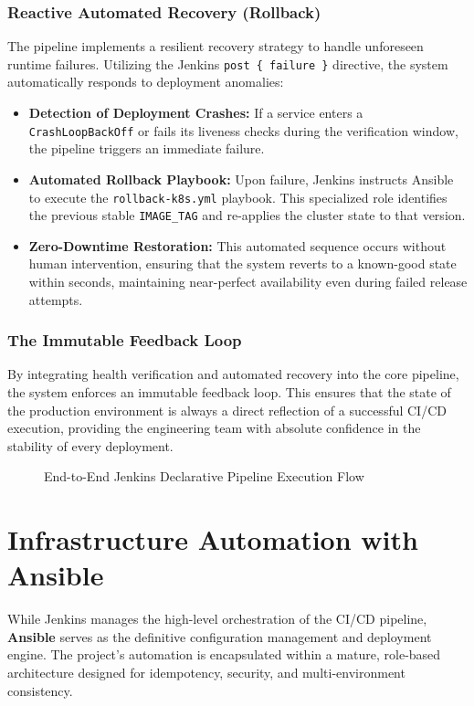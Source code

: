 \documentclass[12pt,a4paper]{report}
\begin{document}
\subsection{Reactive Automated Recovery (Rollback)}
The pipeline implements a resilient recovery strategy to handle unforeseen runtime failures. Utilizing the Jenkins \texttt{post \{ failure \}} directive, the system automatically responds to deployment anomalies:
\begin{itemize}
    \item \textbf{Detection of Deployment Crashes:} If a service enters a \texttt{CrashLoopBackOff} or fails its liveness checks during the verification window, the pipeline triggers an immediate failure.
    \item \textbf{Automated Rollback Playbook:} Upon failure, Jenkins instructs Ansible to execute the \texttt{rollback-k8s.yml} playbook. This specialized role identifies the previous stable \texttt{IMAGE\_TAG} and re-applies the cluster state to that version.
    \item \textbf{Zero-Downtime Restoration:} This automated sequence occurs without human intervention, ensuring that the system reverts to a known-good state within seconds, maintaining near-perfect availability even during failed release attempts.
\end{itemize}

\subsection{The Immutable Feedback Loop}
By integrating health verification and automated recovery into the core pipeline, the system enforces an immutable feedback loop. This ensures that the state of the production environment is always a direct reflection of a successful CI/CD execution, providing the engineering team with absolute confidence in the stability of every deployment.

\begin{figure}[H]
    \centering
    \vspace{7cm} %
    \caption{End-to-End Jenkins Declarative Pipeline Execution Flow}
\end{figure}

\chapter{Infrastructure Automation with Ansible}
While Jenkins manages the high-level orchestration of the CI/CD pipeline, \textbf{Ansible} serves as the definitive configuration management and deployment engine. The project's automation is encapsulated within a mature, role-based architecture designed for idempotency, security, and multi-environment consistency.
\end{document}
